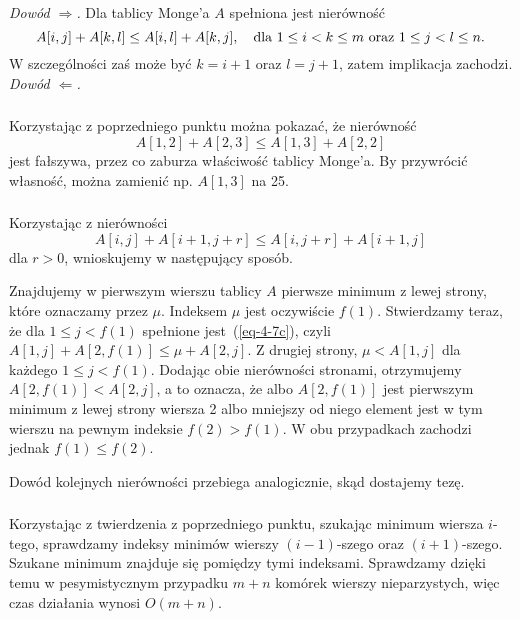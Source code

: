 \subsection{} %

\subsubsection{} %
\noindent\emph{Dowód $\Rightarrow$.} Dla tablicy Monge'a $A$ spełniona jest nierówność
\[
	A[i,j]+A[k,l] \le A[i,l]+A[k,j], \quad\hbox{dla }1\le i<k\le m\hbox{ oraz }1\le j<l\le n.
\]
W szczególności zaś może być $k=i+1$ oraz $l=j+1$, zatem implikacja zachodzi.\\

\noindent\emph{Dowód $\Leftarrow$.}

\subsubsection{} %
Korzystając z poprzedniego punktu można pokazać, że nierówność
\[
	A[1,2]+A[2,3] \le A[1,3]+A[2,2]
\]
jest fałszywa, przez co zaburza właściwość tablicy Monge'a. By przywrócić własność, można zamienić np. $A[1,3]$ na 25.

\subsubsection{} %
Korzystając z nierówności
\begin{equation}
	A[i,j]+A[i+1,j+r] \le A[i,j+r]+A[i+1,j]\label{eq-4-7c}
\end{equation}
dla $r>0$, wnioskujemy w następujący sposób.

Znajdujemy w pierwszym wierszu tablicy $A$ pierwsze minimum z lewej strony, które oznaczamy przez $\mu$. Indeksem $\mu$ jest oczywiście $f(1)$. Stwierdzamy teraz, że dla $1\le j<f(1)$ spełnione jest~(\ref{eq-4-7c}), czyli $A[1,j]+A[2,f(1)]\le\mu+A[2,j]$. Z drugiej strony, $\mu<A[1,j]$ dla każdego $1\le j<f(1)$. Dodając obie nierówności stronami, otrzymujemy $A[2,f(1)]<A[2,j]$, a to oznacza, że albo $A[2,f(1)]$ jest pierwszym minimum z lewej strony wiersza 2 albo mniejszy od niego element jest w tym wierszu na pewnym indeksie $f(2)>f(1)$. W obu przypadkach zachodzi jednak $f(1)\le f(2)$.

Dowód kolejnych nierówności przebiega analogicznie, skąd dostajemy tezę.

\subsubsection{} %
Korzystając z twierdzenia z poprzedniego punktu, szukając minimum wiersza $i$-tego, sprawdzamy indeksy minimów wierszy $(i-1)$-szego oraz $(i+1)$-szego. Szukane minimum znajduje się pomiędzy tymi indeksami. Sprawdzamy dzięki temu w pesymistycznym przypadku $m+n$ komórek wierszy nieparzystych, więc czas działania wynosi $O(m+n)$.

